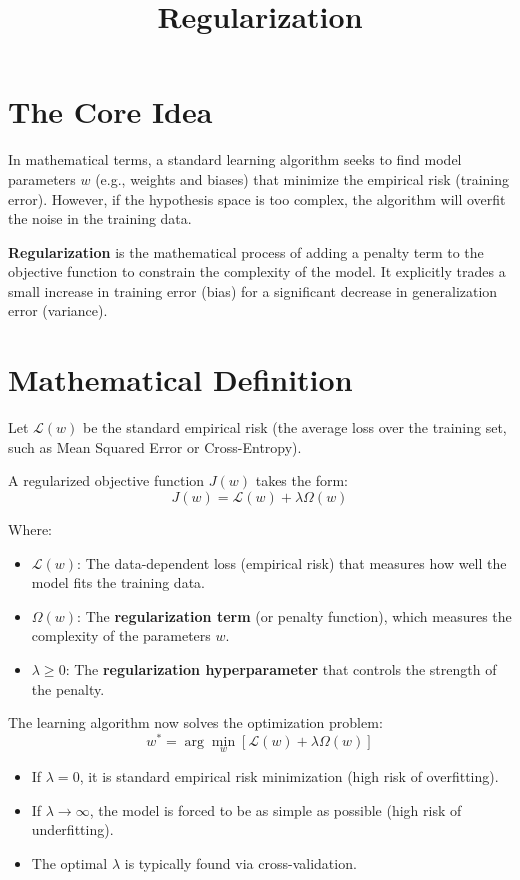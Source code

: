 \documentclass[11pt]{article}
\title{Regularization}
\author{}
\date{}
\begin{document}
\maketitle

\section{The Core Idea}

In mathematical terms, a standard learning algorithm seeks to find model parameters \(w\) (e.g., weights and biases) that minimize the empirical risk (training error). However, if the hypothesis space is too complex, the algorithm will overfit the noise in the training data.

\textbf{Regularization} is the mathematical process of adding a penalty term to the objective function to constrain the complexity of the model. It explicitly trades a small increase in training error (bias) for a significant decrease in generalization error (variance).

\hrulefill

\section{Mathematical Definition}

Let \(\mathcal{L}(w)\) be the standard empirical risk (the average loss over the training set, such as Mean Squared Error or Cross-Entropy). 

A regularized objective function \(J(w)\) takes the form:
\[
 J(w) = \mathcal{L}(w) + \lambda \Omega(w) 
\]

Where:
\begin{itemize}
    \item \textbf{\(\mathcal{L}(w)\)}: The data-dependent loss (empirical risk) that measures how well the model fits the training data.
    \item \textbf{\(\Omega(w)\)}: The \textbf{regularization term} (or penalty function), which measures the complexity of the parameters \(w\).
    \item \textbf{\(\lambda \ge 0\)}: The \textbf{regularization hyperparameter} that controls the strength of the penalty.
\end{itemize}

The learning algorithm now solves the optimization problem:
\[
 w^* = \arg\min_{w} \left[ \mathcal{L}(w) + \lambda \Omega(w) \right] 
\]

\begin{itemize}
    \item If \(\lambda = 0\), it is standard empirical risk minimization (high risk of overfitting).
    \item If \(\lambda \to \infty\), the model is forced to be as simple as possible (high risk of underfitting).
    \item The optimal \(\lambda\) is typically found via cross-validation.
\end{itemize}
\end{document}
